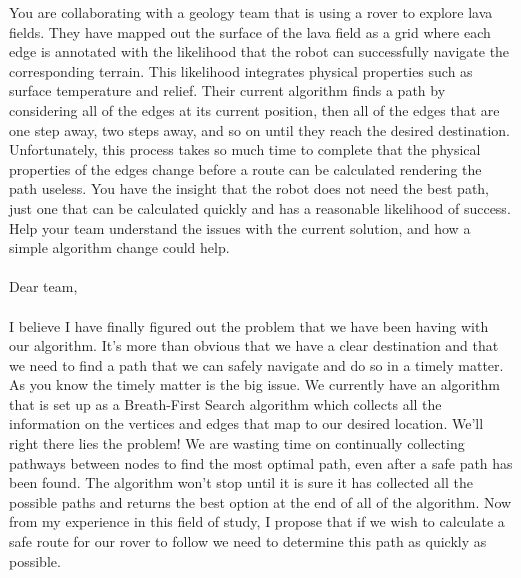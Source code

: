 \documentclass[12pt]{article}
\begin{document}
\renewcommand{\headrulewidth}{0.5pt}

\phantom{Test}
You are collaborating with a geology team that is using a rover to explore lava
fields.  They have mapped out the surface of the lava field as a grid where
each edge is annotated with the likelihood that the robot can successfully
navigate the corresponding terrain. This likelihood integrates physical
properties such as surface temperature and relief. Their current algorithm
finds a path by considering all of the edges at its current position, then all
of the edges that are one step away, two steps away, and so on until they reach
the desired destination. Unfortunately, this process takes so much time to
complete that the physical properties of the edges change before a route can be
calculated rendering the path useless. You have the insight that the robot does
not need the best path, just one that can be calculated quickly and has a
reasonable likelihood of success. Help your team understand the issues with the
current solution, and how a simple algorithm change could help.
\\
\\
Dear team,\\
\\
I believe I have finally figured out the problem that we have been having with our algorithm. It's more than obvious that we have a clear destination and that we need to find a path that we can safely navigate and do so in a timely matter. As you know the timely matter is the big issue. We currently have an algorithm that is set up as a Breath-First Search algorithm which collects all the information on the vertices and edges that map to our desired location. We'll right there lies the problem! We are wasting time on continually collecting pathways between nodes to find the most optimal path, even after a safe path has been found. The algorithm won't stop until it is sure it has collected all the possible paths and returns the best option at the end of all of the algorithm. Now from my experience in this field of study, I propose that if we wish to calculate a safe route for our rover to follow we need to determine this path as quickly as possible.
\\
\end{document}
